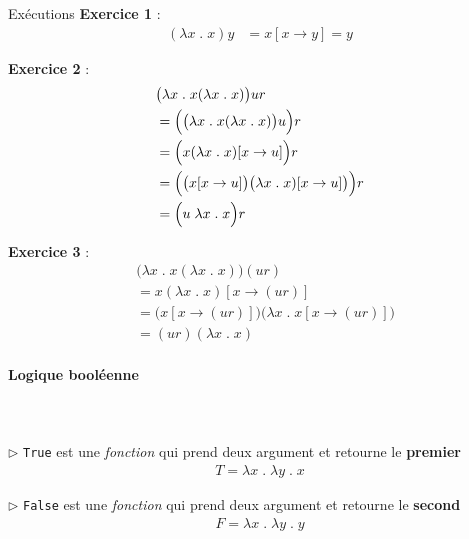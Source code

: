 \documentclass{report}
\begin{document}
\begin{multicols*}{3}
  \begin{EExample}{Exécutions}{}
    \textbf{Exercice 1} :  
      \begin{align*}
        (\lambda x \; . \; x) y 
        &= x[x \rightarrow y] = y
      \end{align*}

    \textbf{Exercice 2} :
      \begin{align*}
      &\bigl( \lambda x \; . \; x (\lambda x \; . \; x) \bigr) u r
      \\
      &= \Bigl(\bigl( \lambda x \; . \; x (\lambda x \; . \; x) \bigr) u\Bigr) r
      \\
      &= \Bigl(  x (\lambda x \; . \; x)[x \rightarrow u] \Bigr) r
      \\
      &= \Bigl(  \bigl(x[x \rightarrow u]\bigr) 
          \bigl(\lambda x \; . \; x)[x \rightarrow u]\bigr) \Bigr) r
      \\
      &= \Bigl(u \; \lambda x \; . \; x \Bigr) r
      \end{align*}

    \textbf{Exercice 3} : 
      \begin{align*}
       &\bigl( \lambda x \; . \; x (\lambda x \; . \; x) \bigr) (u r) 
       \\
       & = x (\lambda x \; . \; x)[x \rightarrow (u r)]
       \\
       & = \bigl(x [x \rightarrow (u r)] \bigr)
           \bigl(\lambda x \; . \; x [x \rightarrow (u r)] \bigr)
        \\ 
       & = (u r)(\lambda x \; . \; x)
      \end{align*}
  \end{EExample}  

  \paragraph{Logique booléenne}
  \mbox{}\\\\
  \noindent
  $\rhd$ \texttt{True} est une \textit{fonction} qui prend deux argument 
  et retourne le \textbf{premier}   
  \begin{align*}
    T = \lambda x \; . \; \lambda y \; . \; x 
  \end{align*}

  \noindent
  $\rhd$ \texttt{False} est une \textit{fonction} qui prend deux argument 
  et retourne le \textbf{second}   
  \begin{align*}
    F = \lambda x \; . \; \lambda y \; . \; y 
  \end{align*}


\end{multicols*}
\end{document}
